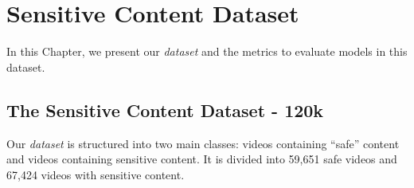 \newpage

\chapter{Sensitive Content Dataset}
\label{chap:dataset}

In this Chapter, we present our \textit{dataset} and the metrics to evaluate models in this dataset.

\section{The Sensitive Content Dataset - 120k}\label{sec:dataset}





Our \textit{dataset} is structured into two main classes: videos containing ``safe'' content and videos containing sensitive content.
It is divided into 59,651 safe videos and 67,424 videos with sensitive content.


